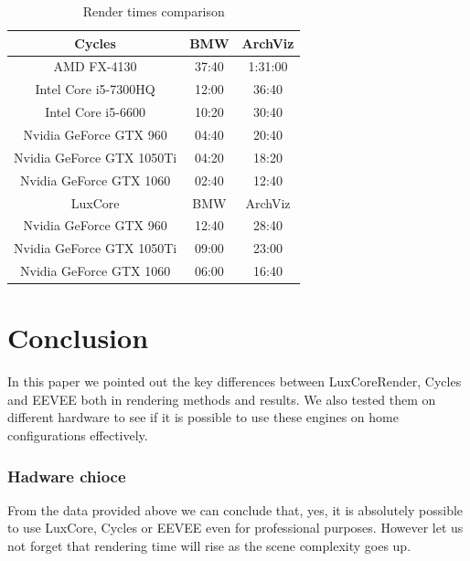 \documentclass[conference]{IEEEtran}
\begin{document}
\setlength{\arrayrulewidth}{0.3mm}
\begin{table}[h!]
\large
\begin{center}
\begin{tabular}{|c|c|c| } 
 \hline
  Cycles & BMW & ArchViz \\ 
  \hline
 \hline
 \rowcolor{red!15}AMD FX-4130 & 37:40 & 1:31:00 \\
 \hline
 \rowcolor{blue!15}Intel Core i5-7300HQ & 12:00 & 36:40 \\ 
 \hline
 \rowcolor{blue!15}Intel Core i5-6600 & 10:20 & 30:40 \\ 
 \hline
 \hline
 \rowcolor{green!15}Nvidia GeForce GTX 960 & 04:40 & 20:40\\
 \hline
 \rowcolor{green!15}Nvidia GeForce GTX 1050Ti & 04:20 & 18:20\\
 \hline
 \rowcolor{green!15}Nvidia GeForce GTX 1060 & 02:40 & 12:40\\
 \hline
 \hline
 \hline
  LuxCore & BMW & ArchViz \\ 
  \hline
 \hline
 \rowcolor{red!15}Nvidia GeForce GTX 960 & 12:40 & 28:40\\
 \hline
 \rowcolor{blue!15}Nvidia GeForce GTX 1050Ti & 09:00 & 23:00\\
 \hline
 \rowcolor{green!15}Nvidia GeForce GTX 1060 & 06:00 & 16:40\\
 \hline
\end{tabular}
\caption{Render times comparison}
\label{table:cyclesTime}
\end{center}
\end{table}

\section{Conclusion}
In this paper we pointed out the key differences between LuxCoreRender, Cycles and EEVEE both in rendering methods and results. We also tested them on different hardware to see if it is possible to use these engines on home configurations effectively.

\subsubsection{Hadware chioce}
    From the data provided above we can conclude that, yes, it is absolutely possible to use LuxCore, Cycles or EEVEE even for professional purposes. However let us not forget that rendering time will rise as the scene complexity goes up.
    
\end{document}
